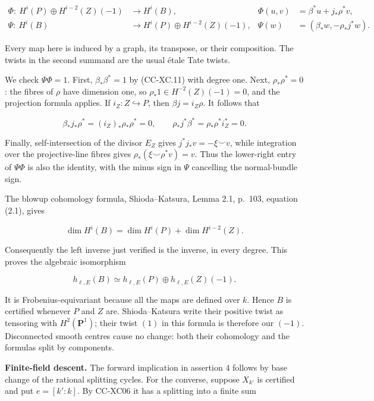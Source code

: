 \[
 \begin{aligned}
 \Phi:\ H^i(P)\oplus H^{i-2}(Z)(-1)&\longrightarrow H^i(B),
 &\Phi(u,v)&=\beta^*u+j_*\rho^*v,\\
 \Psi:\ H^i(B)&\longrightarrow H^i(P)\oplus H^{i-2}(Z)(-1),
 &\Psi(w)&=(\beta_*w,-\rho_*j^*w).
 \end{aligned}
 \tag{CC-XC.12}
\]

Every map here is induced by a graph, its transpose, or their
composition. The twists in the second summand are the usual étale Tate
twists.

We check \(\Psi\Phi=1\). First, \(\beta_*\beta^*=1\) by (CC-XC.11) with
degree one. Next, \(\rho_*\rho^*=0\): the fibres of \(\rho\) have
dimension one, so \(\rho_*1\in H^{-2}(Z)(-1)=0\), and the projection
formula applies. If \(i_Z:Z\hookrightarrow P\), then
\(\beta j=i_Z\rho\). It follows that

\[
 \beta_*j_*\rho^*=(i_Z)_*\rho_*\rho^*=0,\qquad
 \rho_*j^*\beta^*=\rho_*\rho^*i_Z^*=0.
\]

Finally, self-intersection of the divisor \(E_Z\) gives
\(j^*j_*v=-\xi\smile v\), while integration over the projective-line
fibres gives \(\rho_*(\xi\smile\rho^*v)=v\). Thus the lower-right entry
of \(\Psi\Phi\) is also the identity, with the minus sign in \(\Psi\)
cancelling the normal-bundle sign.

The blowup cohomology formula, Shioda--Katsura, Lemma 2.1, p.~103,
equation (2.1), gives

\[
 \dim H^i(B)=\dim H^i(P)+\dim H^{i-2}(Z).
\]

Consequently the left inverse just verified is the inverse, in every
degree. This proves the algebraic isomorphism

\[
 h_{\ell,E}(B)\simeq h_{\ell,E}(P)\oplus h_{\ell,E}(Z)(-1).
 \tag{CC-XC.13}
\]

It is Frobenius-equivariant because all the maps are defined over \(k\).
Hence \(B\) is certified whenever \(P\) and \(Z\) are. Shioda--Katsura
write their positive twist as tensoring with \(H^2(\mathbf P^1)\); their
twist \((1)\) in this formula is therefore our \((-1)\). Disconnected
smooth centres cause no change: both their cohomology and the formulas
split by components.

\textbf{Finite-field descent.} The forward implication in assertion 4
follows by base change of the rational splitting cycles. For the
converse, suppose \(X_{k'}\) is certified and put \(e=[k':k]\). By
CC-XC06 it has a splitting into a finite sum

